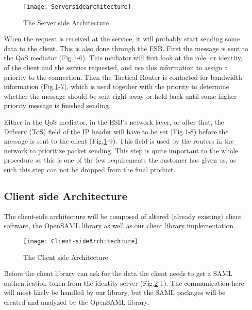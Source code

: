         \begin{figure}[htb]
            \texttt{[image: Serversidearchitecture]}
            \caption{The Server side Architecture}
            \label{fig:Serversidearchitecture}
        \end{figure}

        When the request is received at the service, it will probably start sending some data to the client. This is also done through the ESB. First the message is sent to the QoS mediator (Fig.\ref{fig:Serversidearchitecture}-6). This mediator will first look at the role, or identity, of the client and the service requested, and use this information to assign a priority to the connection. Then the Tactical Router is contacted for bandwidth information (Fig.\ref{fig:Serversidearchitecture}-7), which is used together with the priority to determine whether the message should be sent right away or held back until some higher priority message is finished sending.

        Either in the QoS mediator, in the ESB’s network layer, or after that, the Diffserv (ToS) field of the IP header will have to be set (Fig.\ref{fig:Serversidearchitecture}-8) before the message is sent to the client (Fig.\ref{fig:Serversidearchitecture}-9). This field is used by the routers in the network to prioritize packet sending. This step is quite important to the whole procedure as this is one of the few requirements the customer has given us, as such this step can not be dropped from the final product.
 
    \subsection{Client side Architecture}\label{Client side Architecture} 
    
        The client-side architecture will be composed of altered (already existing) client software, the OpenSAML library as well as our client library implementation.
        
        \begin{figure}[htb]
            \centering
            \texttt{[image: Client-sideArchitechture]}
            \caption{The Client side Architecture}
            \label{fig:Client-sideArchitechture}
        \end{figure}
 
        Before the client library can ask for the data the client needs to get a SAML authentication token from the identity server (Fig.\ref{fig:Client-sideArchitechture}-1). The communication here will most likely be handled by our library, but the SAML packages will be created and analyzed by the OpenSAML library. 


